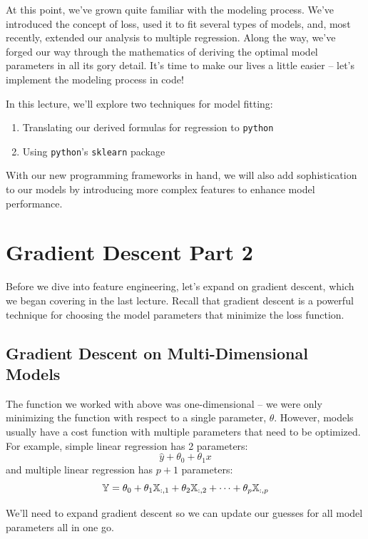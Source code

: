 \documentclass[
  letterpaper,
  DIV=11,
  numbers=noendperiod]{scrreprt}
\providecommand{\tightlist}{%
  \setlength{\itemsep}{0pt}\setlength{\parskip}{0pt}}\usepackage{longtable,booktabs,array}
\begin{document}
At this point, we've grown quite familiar with the modeling process.
We've introduced the concept of loss, used it to fit several types of
models, and, most recently, extended our analysis to multiple
regression. Along the way, we've forged our way through the mathematics
of deriving the optimal model parameters in all its gory detail. It's
time to make our lives a little easier -- let's implement the modeling
process in code!

In this lecture, we'll explore two techniques for model fitting:

\begin{enumerate}
\def\labelenumi{\arabic{enumi}.}
\tightlist
\item
  Translating our derived formulas for regression to \texttt{python}
\item
  Using \texttt{python}'s \texttt{sklearn} package
\end{enumerate}

With our new programming frameworks in hand, we will also add
sophistication to our models by introducing more complex features to
enhance model performance.

\section{Gradient Descent Part 2}\label{gradient-descent-part-2}

Before we dive into feature engineering, let's expand on gradient
descent, which we began covering in the last lecture. Recall that
gradient descent is a powerful technique for choosing the model
parameters that minimize the loss function.

\subsection{Gradient Descent on Multi-Dimensional
Models}\label{gradient-descent-on-multi-dimensional-models}

The function we worked with above was one-dimensional -- we were only
minimizing the function with respect to a single parameter, \(\theta\).
However, models usually have a cost function with multiple parameters
that need to be optimized. For example, simple linear regression has 2
parameters: \[\hat{y} + \theta_0 + \theta_1x\] and multiple linear
regression has \(p+1\) parameters:
\[\mathbb{Y} = \theta_0 + \theta_1 \Bbb{X}_{:,1} + \theta_2 \Bbb{X}_{:,2} + \cdots + \theta_p \Bbb{X}_{:,p}\]

We'll need to expand gradient descent so we can update our guesses for
all model parameters all in one go.
\end{document}
